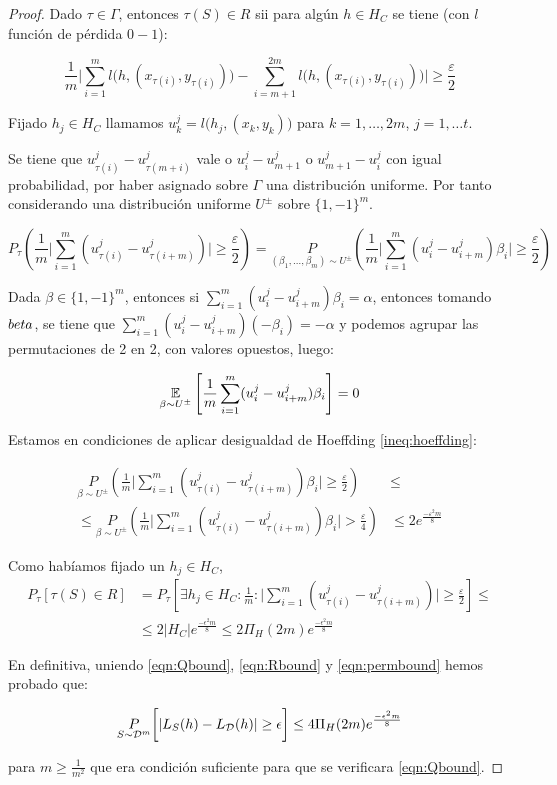 \begin{proof}
  Dado $\tau \in \Gamma$, entonces $\tau(S) \in R$ sii para algún $h\in H_C$ se tiene (con $l$ función de pérdida $0-1$):

  \[\frac{1}{m} \bigg|\sum_{i=1}^m l\big(h,(x_{\tau(i)}, y_{\tau(i)}) \big) - 
    \sum_{i=m+1}^{2m} l\big(h,(x_{\tau(i)}, y_{\tau(i)})\big) \bigg| \ge \frac{\varepsilon}{2}\]
    
    
  Fijado $h_j \in H_C$ llamamos $u_k^j = l \big(h_j, (x_k,y_k) \big)$ para $k=1, \ldots, 2m$, $j=1, \ldots t$.

  Se tiene que $u_{\tau(i)}^j - u_{\tau(m+i)}^j$ vale o $u_i^j - u_{m+1}^j$ o $u_{m+1}^j - u_i^j$ con igual probabilidad,
  por haber asignado sobre $\Gamma$ una distribución uniforme. Por tanto considerando una distribución uniforme $U^{\pm}$ 
  sobre $\{1,-1\}^m$.

  \[P_{\tau} \left(\frac{1}{m} \bigg|\sum_{i=1}^m (u_{\tau(i)}^j - u_{\tau(i+m)}^j) \bigg| \ge \frac{\varepsilon}{2} \right) = 
    \underset{(\beta_1, \ldots, \beta_m) \sim U^{\pm}}{P} \left(\frac{1}{m} \bigg|\sum_{i=1}^m (u_i^j - u_{i+m}^j)\beta_i \bigg| \ge 
    \frac{\varepsilon}{2} \right)\]
    
  Dada $\beta \in \{1,-1\}^m$, entonces si $\sum_{i=1}^m (u_i^j - u_{i+m}^j)\beta_i = \alpha$, entonces tomando $\-beta$,
  se tiene que $\sum_{i=1}^m (u_i^j - u_{i+m}^j)(-\beta_i) = -\alpha$ y podemos agrupar las permutaciones de 2 en 2,
  con valores opuestos, luego:

  \[\underset{\beta \sim U^{\pm}}{\mathbb{E}} \left[\frac{1}{m}\sum_{i=1}^m (u_i^j - u_{i+m}^j)\beta_i \right] = 0\]

  Estamos en condiciones de aplicar desigualdad de Hoeffding \ref{ineq:hoeffding}:

  \begin{align*}
    \underset{\beta \sim U^{\pm}}{P} \left(\frac{1}{m} \bigg|\sum_{i=1}^m (u_{\tau(i)}^j - u_{\tau(i+m)}^j)\beta_i \bigg| \ge 
    \frac{\varepsilon}{2} \right) &\le \\
    \le \underset{\beta \sim U^{\pm}}{P} \left(\frac{1}{m} \bigg|\sum_{i=1}^m (u_{\tau(i)}^j - u_{\tau(i+m)}^j)\beta_i \bigg| > 
    \frac{\varepsilon}{4} \right) &\le 2e^{\frac{-\varepsilon^2m}{8}}
  \end{align*}

  Como habíamos fijado un $h_j\in H_C$, 
  \begin{align*}
  P_{\tau} [\tau(S) \in R] &= P_{\tau} \left[\exists h_j \in H_C: \frac{1}{m} : 
  \bigg|\sum_{i=1}^m (u_{\tau(i)}^j - u_{\tau(i+m)}^j) \bigg| \ge \frac{\varepsilon}{2} \right] \le \\
  &\le 2 |H_C| e^{\frac{-\epsilon^2 m}{8}} \le 2\Pi_H(2m) e^{\frac{-\epsilon^2 m}{8}}
  \end{align*}

  En definitiva, uniendo \eqref{eqn:Qbound}, \eqref{eqn:Rbound} y \eqref{eqn:permbound} hemos probado que:
  
  \[\underset{S\sim \mathcal{D}^m}{P} \bigg[|L_S(h) - L_{\mathcal{D}}(h)| \ge \epsilon \bigg] \le 4 \Pi_H(2m) e^{\frac{-\epsilon^2 m}{8}}\]
  
  para $m \ge \frac{1}{m^2}$ que era condición suficiente para que se verificara \eqref{eqn:Qbound}.
 
\end{proof}

